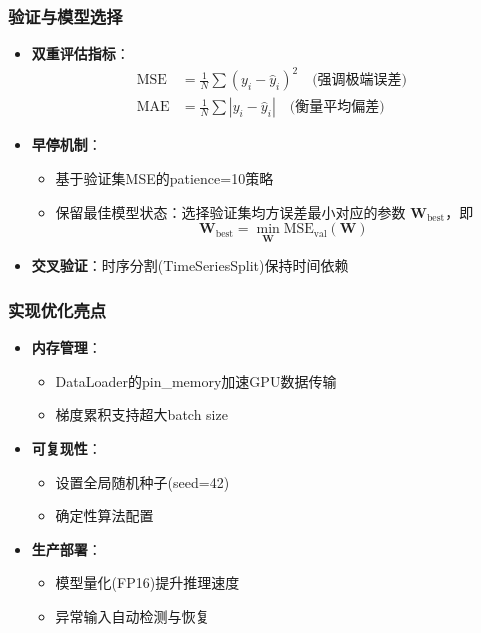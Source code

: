 \documentclass[a4paper,12pt]{ctexart}
\begin{document}
\subsubsection{验证与模型选择}
\begin{itemize}
\item \textbf{双重评估指标}：
  \begin{align*}
  \text{MSE} &= \frac{1}{N}\sum(y_i-\hat{y}_i)^2 \quad \text{(强调极端误差)} \\
  \text{MAE} &= \frac{1}{N}\sum|y_i-\hat{y}_i| \quad \text{(衡量平均偏差)}
  \end{align*}
  
\item \textbf{早停机制}：
  \begin{itemize}
  \item 基于验证集MSE的patience=10策略
    \item 保留最佳模型状态：选择验证集均方误差最小对应的参数 $\mathbf{W}_{\text{best}}$，即
        \[
        \mathbf{W}_{\text{best}} = \min_{\mathbf{W}} \text{MSE}_{\text{val}}(\mathbf{W})
        \]
  \end{itemize}
  
\item \textbf{交叉验证}：时序分割(TimeSeriesSplit)保持时间依赖
\end{itemize}

\subsubsection{实现优化亮点}
\begin{itemize}
\item \textbf{内存管理}：
  \begin{itemize}
  \item DataLoader的pin\_memory加速GPU数据传输
  \item 梯度累积支持超大batch size
  \end{itemize}
  
\item \textbf{可复现性}：
  \begin{itemize}
  \item 设置全局随机种子(seed=42)
  \item 确定性算法配置
  \end{itemize}
  
\item \textbf{生产部署}：
  \begin{itemize}
  \item 模型量化(FP16)提升推理速度
  \item 异常输入自动检测与恢复
  \end{itemize}
\end{itemize}
\end{document}
